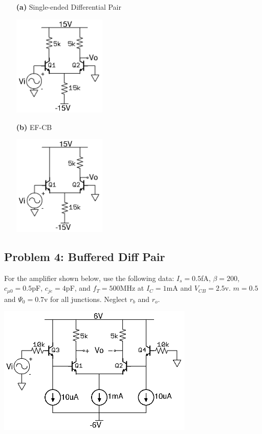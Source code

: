 \documentclass[11pt,twoside]{article}
\begin{document}
\begin{enumerate}
	\item[\bf(a)] Single-ended Differential Pair

\begin{center}
\includegraphics[width=0.35\textwidth]{diff-pair.png}
\end{center}

	\item[\bf(b)] EF-CB

\begin{center}
\includegraphics[width=0.35\textwidth]{ef-cb.png}
\end{center}

\end{enumerate}

\subsection*{Problem 4: Buffered Diff Pair}
For the amplifier shown below, use the following data: $I_s=0.5$fA, $\beta=200$, $c_{\mu 0}=0.5$pF, $c_{je}=4$pF, and $f_T=500$MHz at $I_C=1$mA and $V_{CB}=2.5$v.
$m=0.5$ and $\Psi_0=0.7$v for all junctions.
Neglect $r_b$ and $r_o$.

\begin{center}
\includegraphics[width=0.7\textwidth]{bdp.png}
\end{center}
\end{document}
